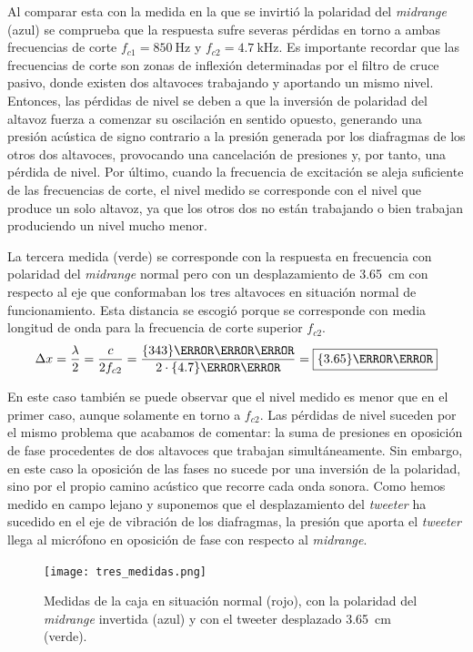 \documentclass[10pt]{article}
\begin{document}
Al comparar esta con la medida en la que se invirtió la polaridad del \textit{midrange} (azul) se comprueba que la respuesta sufre severas pérdidas en torno a ambas frecuencias de corte $f_{c1} = \qty{850}{\hertz }$ y $f_{c2} = \qty{4.7}{\kilo\hertz }$. Es importante recordar que las frecuencias de corte son zonas de inflexión determinadas por el filtro de cruce pasivo, donde existen dos altavoces trabajando y aportando un mismo nivel. Entonces, las pérdidas de nivel se deben a que la inversión de polaridad del altavoz fuerza a comenzar su oscilación en sentido opuesto, generando una presión acústica de signo contrario a la presión generada por los diafragmas de los otros dos altavoces, provocando una cancelación de presiones y, por tanto, una pérdida de nivel. Por último, cuando la frecuencia de excitación se aleja suficiente de las frecuencias de corte, el nivel medido se corresponde con el nivel que produce un solo altavoz, ya que los otros dos no están trabajando o bien trabajan produciendo un nivel mucho menor.

La tercera medida (verde) se corresponde con la respuesta en frecuencia con polaridad del \textit{midrange} normal pero con un desplazamiento de \qty{3.65}{\centi\metre} con respecto al eje que conformaban los tres altavoces en situación normal de funcionamiento. Esta distancia se escogió porque se corresponde con media longitud de onda para la frecuencia de corte superior $f_{c2}$.
\begin{equation} \label{eq:delta_x}
  \Delta x = \frac{\lambda }{2} = \frac{c}{2f_{c2}} = \frac{\qty{343}{\metre \per \second}}{2 \cdot \qty{4.
      7}{\kilo\hertz }} = \boxed{\qty{3.65}{\centi\meter}}
\end{equation}

En este caso también se puede observar que el nivel medido es menor que en el primer caso, aunque solamente en torno a $f_{c2}$. Las pérdidas de nivel suceden por el mismo problema que acabamos de comentar: la suma de presiones en oposición de fase procedentes de dos altavoces que trabajan simultáneamente. Sin embargo, en este caso la oposición de las fases no sucede por una inversión de la polaridad, sino por el propio camino acústico que recorre cada onda sonora. Como hemos medido en campo lejano y suponemos que el desplazamiento del \textit{tweeter} ha sucedido en el eje de vibración de los diafragmas, la presión que aporta el \textit{tweeter} llega al micrófono en oposición de fase con respecto al \textit{midrange}.

\begin{figure}[hbtp]
  \centering
  \texttt{[image: tres\_medidas.png]}
  \caption{Medidas de la caja en situación normal (rojo), con la polaridad del \textit{midrange} invertida (azul) y con el tweeter desplazado \qty{3.65}{\centi\metre} (verde).}
  \label{fig:tres_medidas}
\end{figure}
\end{document}
